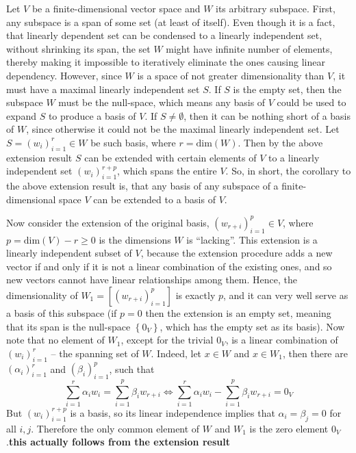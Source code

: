 \documentclass[a4paper]{article}
\newcommand{\obj}[1]{\ensuremath{\left\{ #1 \right\}}}
\newcommand{\brac}[1]{\ensuremath{\left( #1 \right)}}
\newcommand{\spn}[1]{\ensuremath{\left[ #1 \right]}}
\newcommand{\Dim}[1]{\ensuremath{\text{dim}\brac{ #1 }}}
\begin{document}
Let $V$ be a finite-dimensional vector space and $W$ its arbitrary subspace. First, any subspace is a span of some set (at least of itself). Even though it is a fact, that linearly dependent set can be condensed to a linearly independent set, without shrinking its span, the set $W$ might have infinite number of elements, thereby making it impossible to iteratively eliminate the ones causing linear dependency. However, since $W$ is a space of not greater dimensionality than $V$, it must have a maximal linearly independent set $S$. If $S$ is the empty set, then the subspace $W$ must be the null-space, which means any basis of $V$ could be used to expand $S$ to produce a basis of $V$. If $S\neq \emptyset$, then it can be nothing short of a basis of $W$, since otherwise it could not be the maximal linearly independent set. Let $S = \brac{w_i}_{i=1}^r \in W$ be such basis, where $r = \Dim{W}$. Then by the above extension result $S$ can be extended with certain elements of $V$ to a linearly independent set $\brac{w_i}_{i=1}^{r+p}$, which spans the entire $V$. So, in short, the corollary to the above extension result is, that any basis of any subspace of a finite-dimensional space $V$ can be extended to a basis of $V$.

Now consider the extension of the original basis, $\brac{w_{r+i}}_{i=1}^p \in V$, where $p = \Dim{V} - r\geq 0$ is the dimensions $W$ is ``lacking''. This extension is a linearly independent subset of $V$, because the extension procedure adds a new vector if and only if it is not a linear combination of the existing ones, and so new vectors cannot have linear relationships among them. Hence, the dimensionality of $W_1 = \spn{\brac{w_{r+i}}_{i=1}^p}$ is exactly $p$, and it can very well serve as a basis of this subspace (if $p=0$ then the extension is an empty set, meaning that its span is the null-space $\obj{0_V}$, which has the empty set as its basis). Now note that no element of $W_1$, except for the trivial $0_V$, is a linear combination of $\brac{w_i}_{i=1}^r$ -- the spanning set of $W$. Indeed, let $x \in W$ and $x \in W_1$, then there are $\brac{\alpha_i}_{i=1}^r$ and $\brac{\beta_i}_{i=1}^p$, such that \[\sum_{i=1}^r \alpha_i w_i = \sum_{i=1}^p \beta_i w_{r+i} \Leftrightarrow \sum_{i=1}^r \alpha_i w_i - \sum_{i=1}^p \beta_i w_{r+i} = 0_V\] But $\brac{w_i}_{i=1}^{r+p}$ is a basis, so its linear independence implies that $\alpha_i = \beta_j = 0$ for all $i,j$. Therefore the only common element of $W$ and $W_1$ is the zero element $0_V$.\textbf{this actually follows from the extension result}
\end{document}
